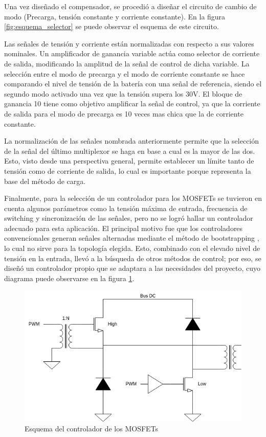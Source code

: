 Una vez diseñado el compensador, se procedió a diseñar el circuito de cambio de modo (Precarga, tensión constante y corriente constante).
En la figura \ref{fig:esquema_selector} se puede observar el esquema de este circuito.

Las señales de tensión y corriente están normalizadas con respecto a sus valores nominales.
Un amplificador de ganancia variable actúa como selector de corriente de salida,
modificando la amplitud de la señal de control de dicha variable.
La selección entre el modo de precarga y el modo de corriente constante se hace comparando el nivel de tensión de la batería
con una señal de referencia, siendo el segundo modo activado una vez que la tensión supera los 30V.
El bloque de ganancia 10 tiene como objetivo amplificar la señal de control, ya que la corriente de salida para el modo
de precarga es 10 veces mas chica que la de corriente constante.

La normalización de las señales nombrada anteriormente permite que la selección de la señal del último multiplexor
se haga en base a cual es la mayor de las dos. Esto, visto desde una perspectiva general, permite establecer un límite
tanto de tensión como de corriente de salida, lo cual es importante porque representa la base del método de carga.

Finalmente, para la selección de un controlador para los MOSFETs se tuvieron en cuenta algunos parámetros como
la tensión máxima de entrada, frecuencia de switching y sincronización de las señales,
pero no se logró hallar un controlador adecuado para esta aplicación.
El principal motivo fue que los controladores convencionales generan señales alternadas mediante el método de bootstrapping \cite{hart},
lo cual no sirve para la topología elegida. Esto, combinado con el elevado nivel de tensión en la entrada,
llevó a la búsqueda de otros métodos de control; por eso, se diseñó un controlador propio que se adaptara
a las necesidades del proyecto, cuyo diagrama puede observarse en la figura \ref{fig:driver}.

\begin{figure}
    \centering
    \includegraphics[width=\textwidth]{images/driver.png}
    \caption{Esquema del controlador de los MOSFETs}
    \label{fig:driver}
\end{figure}

